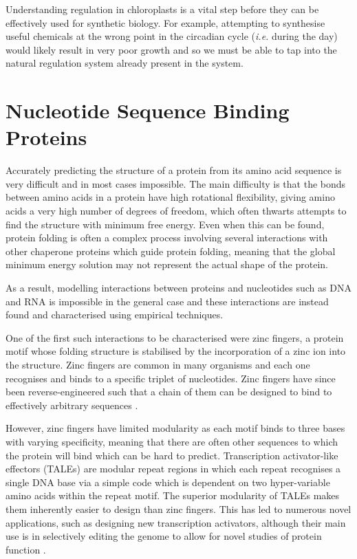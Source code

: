 Understanding regulation in chloroplasts is a vital step before they can be
effectively used for synthetic biology.
For example, attempting to synthesise useful chemicals at the wrong point in 
the circadian cycle (\emph{i.e.} during the day) would likely result in very 
poor growth and so we must be
able to tap into the natural regulation system already present in the system.

\section{Nucleotide Sequence Binding Proteins}
\label{sec:intro_binding}

Accurately predicting the structure of a protein from its amino acid sequence 
is very difficult and in most cases impossible.
The main difficulty is that the bonds between amino acids in a protein have
high rotational flexibility, giving amino acids a very high number of degrees 
of freedom,
which often thwarts attempts to find the structure with minimum free energy.
Even when this can be found, protein folding is often a complex process
involving several interactions with other chaperone proteins which guide
protein folding, meaning that the global minimum energy solution may not 
represent the actual shape of the protein.

As a result, modelling interactions between proteins and nucleotides such as
DNA and RNA is impossible in the general case and these interactions are
instead found and characterised using empirical techniques.

One of the first such interactions to be characterised were zinc fingers, a
protein motif whose folding structure is stabilised by the incorporation of a
zinc ion into the structure.
Zinc fingers are common in many organisms and each one recognises and binds to 
a specific triplet of nucleotides.
Zinc fingers have since been reverse-engineered such that a chain of them can
be designed to bind to effectively arbitrary sequences 
\citep[reviewed in][]{Gaj2013}.

However, zinc fingers have limited modularity as each motif binds to three
bases with varying specificity, meaning that there are often other sequences to
which the protein will bind which can be hard to predict.
Transcription activator-like effectors (TALEs) are modular repeat regions in
which each repeat recognises a single DNA base via a simple code which is
dependent on two hyper-variable amino acids within the repeat motif.
The superior modularity of TALEs makes them inherently easier to design than 
zinc fingers.
This has led to numerous novel applications, such as designing new 
transcription activators, although their main use is in selectively editing 
the genome to allow for novel studies of protein function 
\citep[reviewed in][]{Sun2013}.

